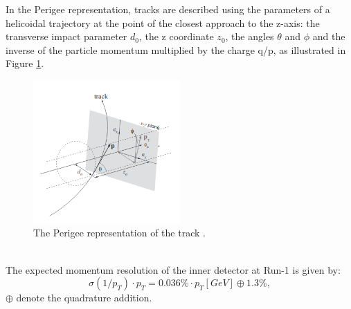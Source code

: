 In the Perigee representation, tracks are described using the parameters of a helicoidal trajectory at the point of the closest approach to the z-axis: the transverse impact parameter $d_0$, the z coordinate $z_0$, the angles $\theta$ and $\phi$ and the inverse of the particle momentum multiplied by the charge q/p, as illustrated in Figure \ref{fig:chap2:ATLAS:ITK:Trk}.
\begin{figure}[htbp]
    \centering
    \includegraphics[width=0.5\textwidth]{Ch2/Img/Track.png}
    \caption{The Perigee representation of the track \cite{Track_schema}.}
    \label{fig:chap2:ATLAS:ITK:Trk}
\end{figure}
\\
The expected momentum resolution of the inner detector at Run-1 is given by:
\begin{equation}
    \sigma(1/p_T)\cdot p_T = 0.036\%\cdot p_T [GeV] \oplus 1.3\%,
\end{equation}
$\oplus$ denote the quadrature addition.

